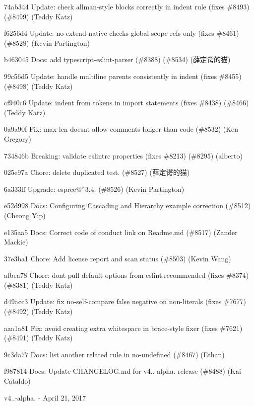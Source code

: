 \begin{DoxyItemize}
\item 74ab344 Update\+: check allman-\/style blocks correctly in indent rule (fixes \#8493) (\#8499) (Teddy Katz)
\item f6256d4 Update\+: no-\/extend-\/native checks global scope refs only (fixes \#8461) (\#8528) (Kevin Partington)
\item b463045 Docs\+: add typescript-\/eslint-\/parser (\#8388) (\#8534) (薛定谔的猫)
\item 99c56d5 Update\+: handle multiline parents consistently in indent (fixes \#8455) (\#8498) (Teddy Katz)
\item cf940c6 Update\+: indent {\ttfamily from} tokens in import statements (fixes \#8438) (\#8466) (Teddy Katz)
\item 0a9a90f Fix\+: max-\/len doesn\textquotesingle{}t allow comments longer than code (\#8532) (Ken Gregory)
\item 734846b Breaking\+: validate eslintrc properties (fixes \#8213) (\#8295) (alberto)
\item 025e97a Chore\+: delete duplicated test. (\#8527) (薛定谔的猫)
\item 6a333ff Upgrade\+: espree@\texorpdfstring{$^\wedge$}{\string^}3.4. (\#8526) (Kevin Partington)
\item e52d998 Docs\+: Configuring Cascading and Hierarchy example correction (\#8512) (Cheong Yip)
\item e135aa5 Docs\+: Correct code of conduct link on Readme.\+md (\#8517) (Zander Mackie)
\item 37e3ba1 Chore\+: Add license report and scan status (\#8503) (Kevin Wang)
\item afbea78 Chore\+: don\textquotesingle{}t pull default options from eslint\+:recommended (fixes \#8374) (\#8381) (Teddy Katz)
\item d49acc3 Update\+: fix no-\/self-\/compare false negative on non-\/literals (fixes \#7677) (\#8492) (Teddy Katz)
\item aaa1a81 Fix\+: avoid creating extra whitespace in brace-\/style fixer (fixes \#7621) (\#8491) (Teddy Katz)
\item 9c3da77 Docs\+: list another related rule in no-\/undefined (\#8467) (Ethan)
\item f987814 Docs\+: Update CHANGELOG.\+md for v4..-\/alpha. release (\#8488) (Kai Cataldo)
\end{DoxyItemize}

v4..-\/alpha. -\/ April 21, 2017


